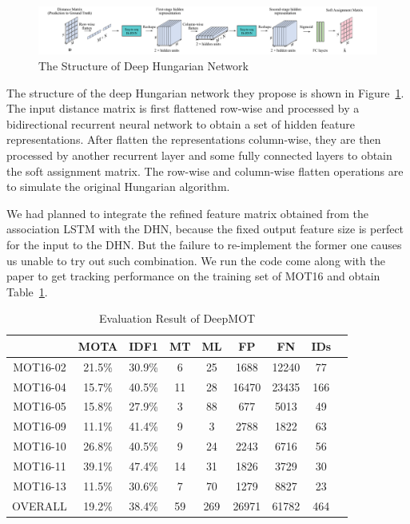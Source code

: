 \documentclass[conference]{IEEEtran}
\begin{document}
\begin{figure}
    \centering
    \includegraphics[width=\linewidth]{fig/dhn.png}
    \caption{The Structure of Deep Hungarian Network\protect\footnotemark}
    \label{fig:dhn-struct}
\end{figure}

The structure of the deep Hungarian network they propose is shown in Figure~\ref{fig:dhn-struct}.
The input distance matrix is first flattened row-wise and processed by a bidirectional recurrent neural network to obtain a set of hidden feature representations.
After flatten the representations column-wise, they are then processed by another recurrent layer and some fully connected layers to obtain the soft assignment matrix.
The row-wise and column-wise flatten operations are to simulate the original Hungarian algorithm.


We had planned to integrate the refined feature matrix obtained from the association LSTM with the DHN, because the fixed output feature size is perfect for the input to the DHN.
But the failure to re-implement the former one causes us unable to try out such combination.
We run the code come along with the paper to get tracking performance on the training set of MOT16 and obtain Table~\ref{tab:eval-deepmot}.

\linespread{1.2}
\begin{table}[h]
    \caption{Evaluation Result of DeepMOT}
    \label{tab:eval-deepmot}
    \begin{tabular}{ccccccccc}
        \hline
        & MOTA & IDF1 & MT & ML & FP & FN & IDs\\\hline
        MOT16-02 & 21.5\% & 30.9\% & 6 & 25 & 1688 & 12240 & 77\\
        MOT16-04 & 15.7\% & 40.5\% & 11 & 28 & 16470 & 23435 & 166\\
        MOT16-05 & 15.8\% & 27.9\% & 3 & 88 & 677 & 5013 & 49\\
        MOT16-09 & 11.1\% & 41.4\% & 9 & 3 & 2788 & 1822 & 63\\
        MOT16-10 & 26.8\% & 40.5\% & 9 & 24 & 2243 & 6716 & 56\\
        MOT16-11 & 39.1\% & 47.4\% & 14 & 31 & 1826 & 3729 & 30\\
        MOT16-13 & 11.5\% & 30.6\% & 7 & 70 & 1279 & 8827 & 23\\
        OVERALL & 19.2\% & 38.4\% & 59 & 269 & 26971 & 61782 & 464\\\hline
    \end{tabular}
\end{table}
\linespread{1.0}
\end{document}
